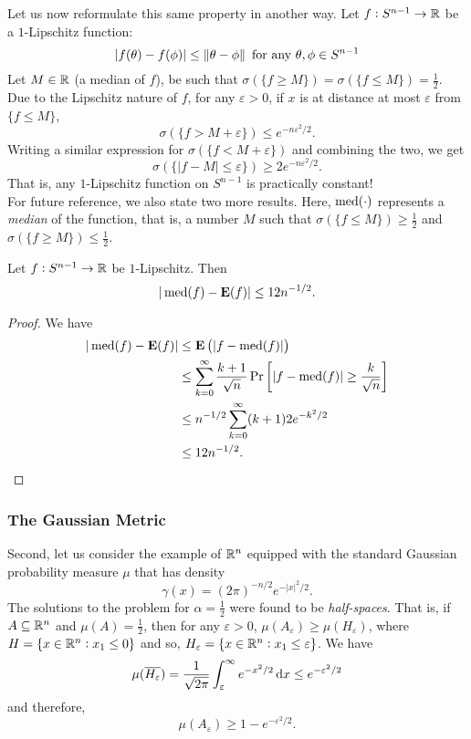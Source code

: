 Let us now reformulate this same property in another way. Let $f:S^{n-1}\to\mathbb{R}$ be a $1$-Lipschitz function:
\[ |f(\theta)-f(\phi)|\leq\left\lVert\theta-\phi\right\rVert\text{ for any }\theta,\phi\in S^{n-1}\]
Let $M\in\mathbb{R}$ (a median of $f$), be such that $\sigma(\{f\geq M\})=\sigma(\{f\leq M\})=\frac{1}{2}$. Due to the Lipschitz nature of $f$, for any $\varepsilon>0$, if $x$ is at distance at most $\varepsilon$ from $\{f\leq M\}$,
\[ \sigma(\{f > M+\varepsilon\}) \leq e^{-n\varepsilon^2/2}. \]
Writing a similar expression for $\sigma(\{f < M+\varepsilon\})$ and combining the two, we get
\[ \sigma(\{|f-M| \le \varepsilon\}) \ge 2e^{-n\varepsilon^2/2}. \]
That is, any $1$-Lipschitz function on $S^{n-1}$ is practically constant!\\

For future reference, we also state two more results. Here, $\operatorname{med}(\cdot)$ represents a \textit{median} of the function, that is, a number $M$ such that $\sigma(\{f\leq M\})\geq\frac{1}{2}$ and $\sigma(\{f\geq M\})\leq\frac{1}{2}$.

\begin{lemma}
\label{lipschitz function median expectation bound}
Let $f:S^{n-1}\to\mathbb{R}$ be $1$-Lipschitz. Then
\[ |\operatorname{med}(f)-\textbf{E}(f)| \leq 12n^{-1/2}. \]
\end{lemma}
\begin{proof}
We have
\begin{align*}
    |\operatorname{med}(f) - \textbf{E}(f)| &\leq \textbf{E}\left(|f-\operatorname{med}(f)|\right) \\
    &\leq \sum_{k=0}^\infty \frac{k+1}{\sqrt{n}} \Pr\left[|f-\operatorname{med}(f)| \geq \frac{k}{\sqrt{n}}\right] \\
    &\leq n^{-1/2} \sum_{k=0}^\infty (k+1) 2e^{-k^2/2} \\
    &\leq 12n^{-1/2}.
\end{align*}
\end{proof}

\subsubsection{The Gaussian Metric}

Second, let us consider the example of $\mathbb{R}^n$ equipped with the standard Gaussian probability measure $\mu$ that has density
\[ \gamma(x) = (2\pi)^{-n/2} e^{-|x|^2/2}. \]
The solutions to the problem for $\alpha=\frac{1}{2}$ were found to be \textit{half-spaces}. That is, if $A\subseteq\mathbb{R}^n$ and $\mu(A) = \frac{1}{2}$, then for any $\varepsilon>0$, $\mu(A_\varepsilon)\geq\mu(H_\varepsilon)$, where $H=\{x\in\mathbb{R}^n:x_1\leq 0\}$ and so, $H_\varepsilon = \{x\in\mathbb{R}^n:x_1\leq\varepsilon\}$. We have
\[ \mu(\overline{H_\varepsilon}) = \frac{1}{\sqrt{2\pi}}\int_\varepsilon^\infty e^{-x^2/2}\operatorname{d}\!{x} \leq e^{-\varepsilon^2/2} \]
and therefore,
\[ \mu(A_\varepsilon) \geq 1 - e^{-\varepsilon^2/2}. \]

